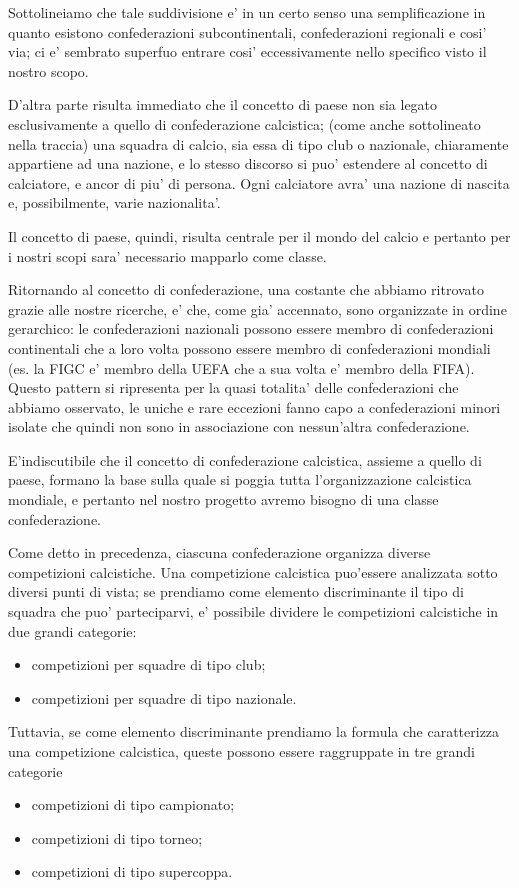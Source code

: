 Sottolineiamo che tale suddivisione e' in un certo senso una semplificazione in quanto
esistono confederazioni subcontinentali, confederazioni regionali e cosi' via; ci e' sembrato
superfuo entrare cosi' eccessivamente nello specifico visto il nostro scopo.

D'altra parte risulta immediato che il concetto di paese non sia legato esclusivamente a quello
di confederazione calcistica; (come anche sottolineato nella traccia) una squadra di calcio,
sia essa di tipo club o nazionale, chiaramente appartiene ad una nazione, e lo stesso discorso
si puo' estendere al concetto di calciatore, e ancor di piu' di persona.
Ogni calciatore avra' una nazione di nascita e, possibilmente, varie nazionalita'.

Il concetto di paese, quindi, risulta centrale per il mondo del calcio e pertanto per i nostri
scopi sara' necessario mapparlo come classe.

Ritornando al concetto di confederazione, una costante che abbiamo ritrovato grazie alle nostre
ricerche, e' che, come gia' accennato, sono organizzate in ordine gerarchico: le confederazioni
nazionali possono essere membro di confederazioni continentali che a loro volta possono essere
membro di confederazioni mondiali (es. la FIGC e' membro della UEFA che a sua volta e' membro
della FIFA).
Questo pattern si ripresenta per la quasi totalita' delle confederazioni che abbiamo osservato,
le uniche e rare eccezioni fanno capo a confederazioni minori isolate che quindi non sono in
associazione con nessun'altra confederazione.

E'indiscutibile che il concetto di confederazione calcistica, assieme a quello di paese,
formano la base sulla quale si poggia tutta l'organizzazione calcistica mondiale, e pertanto
nel nostro progetto avremo bisogno di una classe confederazione.

Come detto in precedenza, ciascuna confederazione organizza diverse competizioni calcistiche.
Una competizione calcistica puo'essere analizzata sotto diversi punti di vista;
se prendiamo come elemento discriminante il tipo di squadra che puo' parteciparvi, e' possibile
dividere le competizioni calcistiche in due grandi categorie:
\begin{itemize}
	\item competizioni per squadre di tipo club;
	\item competizioni per squadre di tipo nazionale.
\end{itemize}

Tuttavia, se come elemento discriminante prendiamo la formula che caratterizza una competizione
calcistica, queste possono essere raggruppate in tre grandi categorie
\begin{itemize}
	\item competizioni di tipo campionato;
	\item competizioni di tipo torneo;
	\item competizioni di tipo supercoppa.
\end{itemize}

